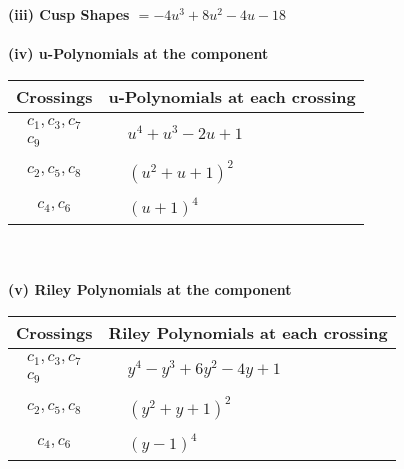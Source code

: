 \documentclass[1p]{elsarticle_modified}
\theoremstyle{definition}
\begin{document}
\flushleft \textbf{(iii) Cusp Shapes $= -4 u^3+8 u^2-4 u-18$}\\~\\
\newpage\renewcommand{\arraystretch}{1}
\flushleft \textbf{(iv) u-Polynomials at the component}\newline \\
\begin{tabular}{m{50pt}|m{274pt}}
Crossings & \hspace{64pt}u-Polynomials at each crossing \\
\hline $$\begin{aligned}c_{1},c_{3},c_{7}\\c_{9}\end{aligned}$$&$\begin{aligned}
&u^4+u^3-2 u+1
\end{aligned}$\\
\hline $$\begin{aligned}c_{2},c_{5},c_{8}\end{aligned}$$&$\begin{aligned}
&(u^2+u+1)^2
\end{aligned}$\\
\hline $$\begin{aligned}c_{4},c_{6}\end{aligned}$$&$\begin{aligned}
&(u+1)^4
\end{aligned}$\\
\hline
\end{tabular}\\~\\
\newpage\renewcommand{\arraystretch}{1}
\flushleft \textbf{(v) Riley Polynomials at the component}\newline \\
\begin{tabular}{m{50pt}|m{274pt}}
Crossings & \hspace{64pt}Riley Polynomials at each crossing \\
\hline $$\begin{aligned}c_{1},c_{3},c_{7}\\c_{9}\end{aligned}$$&$\begin{aligned}
&y^4- y^3+6 y^2-4 y+1
\end{aligned}$\\
\hline $$\begin{aligned}c_{2},c_{5},c_{8}\end{aligned}$$&$\begin{aligned}
&(y^2+y+1)^2
\end{aligned}$\\
\hline $$\begin{aligned}c_{4},c_{6}\end{aligned}$$&$\begin{aligned}
&(y-1)^4
\end{aligned}$\\
\hline
\end{tabular}\\~\\
\end{document}
